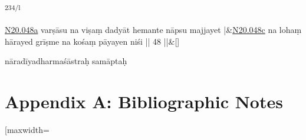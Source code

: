 \documentclass[article,12pt,a4paper]{memoir}%
\begin{document}
	  
	  \textsuperscript{\textenglish{234/l}}
	    
	    \stanza[\smallbreak]
	  \href{http://sarit.indology.info/?cref=n\%C4\%81sm.20.048a}{N20.048a} varṣāsu na viṣaṃ dadyāt hemante nāpsu majjayet |&\href{http://sarit.indology.info/?cref=n\%C4\%81sm.20.048c}{N20.048c} na lohaṃ hārayed grīṣme na kośaṃ pāyayen niśi || 48 ||\&[\smallbreak]
	  
	  
	  
		
		\pstart
		\begin{center}
	      nāradīyadharmaśāstraḥ samāptaḥ
		\end{center}
		\pend
		
	      
	    
	    \endnumbering%
	    \endgroup
	    
	  \backmatter 
\chapter*[{Appendix A: Bibliographic Notes}]{Appendix A: Bibliographic Notes} \par \ctable[maxwidth=\textwidth
\end{document}
